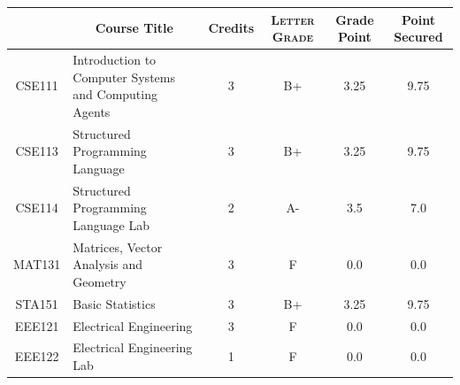 \documentclass[11pt]{article}
\newcommand*{\numtwo}[1]{\pgfmathprintnumber[
                    fixed, precision=2, fixed zerofill=true]{#1}}
\begin{document}
                \begin{center}
                    \renewcommand{\arraystretch}{1.08}
                    
                \begin{tabular}{|c|l|c|>{\scshape}c|c|c|}
                \hline  \rule[-1ex]{0pt}{3.5ex} {\centering{\bf Course Code}} &  \multicolumn{1}{c|}{\textbf{Course Title}}  & {\bf Credits} & {\bf Letter Grade} & {\bf Grade Point} & {\bf Point Secured}  \\ 
                \hline   CSE111 &  Introduction to Computer Systems and Computing Agents		 & 3 & B+ & 3.25 & 9.75 \\ %
                \hline   CSE113 &  Structured Programming Language		 & 3 & B+ & 3.25 & 9.75 \\ %
                \hline   CSE114 &  Structured Programming Language Lab		 & 2 & A- & 3.5 & 7.0 \\ %
                \hline   MAT131 &  Matrices, Vector Analysis and Geometry		 & 3 & F & 0.0 & 0.0 \\ %
                \hline   STA151 &  Basic Statistics		 & 3 & B+ & 3.25 & 9.75 \\ %
                \hline   EEE121 &  Electrical Engineering		 & 3 & F & 0.0 & 0.0 \\ %
                \hline   EEE122 &  Electrical Engineering Lab		 & 1 & F & 0.0 & 0.0 \\ %

\hline                %
                \end{tabular}
                \end{center}
                \renewcommand{\arraystretch}{1.03}
\end{document}
